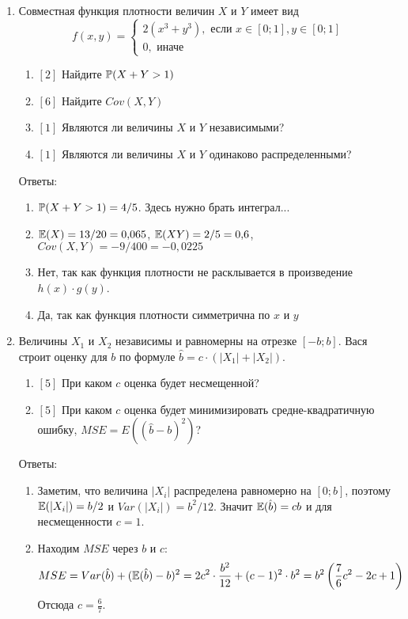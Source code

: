 \documentclass[pdftex,12pt,a4paper]{article}
\begin{document}
\begin{enumerate}

\item Совместная функция плотности величин $X$ и $Y$ имеет вид
\begin{equation}
f(x,y)=\begin{cases}
2(x^3+y^3), \mbox{ если } x\in [0;1], y\in [0;1] \\
0, \mbox{ иначе}
\end{cases} 
\end{equation}
\begin{enumerate}
\item $[2]$ Найдите $\P(X+Y>1)$
\item $[6]$ Найдите $Cov(X,Y)$
\item $[1]$ Являются ли величины $X$ и $Y$ независимыми? 
\item $[1]$ Являются ли величины $X$ и $Y$ одинаково распределенными?
\end{enumerate}

Ответы:
\begin{enumerate}
\item $\P(X+Y>1)=4/5$. Здесь нужно брать интеграл...
\item $\E(X)=13/20=0{,}065$, $\E(XY)=2/5=0{,}6$, $Cov(X,Y)=-9/400=-0{,}0225$
\item Нет, так как функция плотности не расклывается в произведение $h(x)\cdot g(y)$.
\item Да, так как функция плотности симметрична по $x$ и $y$
\end{enumerate}


\item Величины $X_1$ и $X_2$ независимы и равномерны на отрезке $[-b;b]$. Вася строит оценку для $b$ по формуле $\hat{b}=c\cdot (|X_{1}|+|X_{2}|)$. 
\begin{enumerate}
\item $[5]$ При каком $c$ оценка будет несмещенной? 
\item $[5]$ При каком $c$ оценка будет минимизировать средне-квадратичную ошибку, $MSE=E((\hat{b}-b)^{2})$? 
\end{enumerate}

Ответы:
\begin{enumerate}
\item Заметим, что величина $|X_i|$ распределена равномерно на $[0;b]$, поэтому $\E(|X_i|)=b/2$ и $Var(|X_i|)=b^2/12$. Значит $\E(\hat{b})=cb$ и для несмещенности $c=1$.
\item Находим $MSE$ через $b$ и $c$:
\begin{equation}
MSE=Var(\hat{b})+(\E(\hat{b})-b)^2=2c^2\cdot \frac{b^2}{12}+(c-1)^2\cdot b^2=b^2\left(\frac{7}{6}c^2-2c+1\right)
\end{equation}
Отсюда $c=\frac{6}{7}$.
\end{enumerate}



\end{enumerate}
\end{document}
